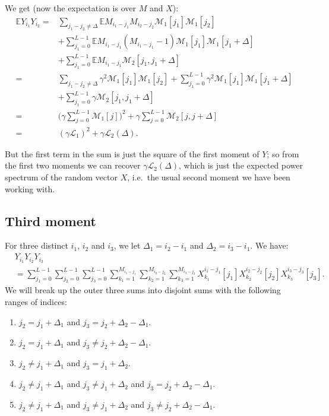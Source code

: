 \documentclass[12pt]{article}
\newcommand{\E}{\mathbb{E}}
\newcommand{\1}{\mathbf{1}}
\newcommand{\M}{\mathcal{M}}
\renewcommand{\L}{\mathcal{L}}
\theoremstyle{plain}
\theoremstyle{definition}
\theoremstyle{remark}
\theoremstyle{plain}
\theoremstyle{remark}
\theoremstyle{plain}
\theoremstyle{plain}
\theoremstyle{plain}
\numberwithin{equation}{section}
\begin{document}
We get (now the expectation is over $M$ and $X$):
%
\begin{align}
%
\E Y_{i_1} Y_{i_2} 
=& \sum_{j_1 - j_2 \ne \Delta} \E M_{i_1-j_1} M_{i_2 - j_2} \M_1[j_1] \M_1[j_2]
\nonumber \\
& + \sum_{j_1 = 0}^{L-1} \E M_{i_1-j_1}(M_{i_1-j_1} - 1) \M_1[j_1] \M_1[j_1 + \Delta]
\nonumber \\
& + \sum_{j_1 = 0}^{L-1} \E M_{i_1-j_1} \M_2[j_1,j_1 + \Delta]
\nonumber \\
=& \sum_{j_1 - j_2 \ne \Delta} \gamma^2 \M_1[j_1] \M_1[j_2]
+ \sum_{j_1 = 0}^{L-1} \gamma^2 \M_1[j_1] \M_1[j_1 + \Delta]
\nonumber \\
& + \sum_{j_1 = 0}^{L-1} \gamma \M_2[j_1,j_1 + \Delta]
\nonumber \\
=&  \bigg(\gamma \sum_{j = 0}^{L-1} \M_1[j] \bigg)^2
+ \gamma \sum_{j = 0}^{L-1} \M_2[j,j + \Delta]
\nonumber \\
=&  (\gamma \L_1)^2 + \gamma \L_2(\Delta).
%
\end{align}

But the first term in the sum is just the square of the first moment of $Y$; so from the first two moments we can recover $\gamma \L_2(\Delta)$, which is just the expected power spectrum of the random vector $X$, i.e.\ the usual second moment we have been working with.


%


\subsection{Third moment}

For three distinct $i_1$, $i_2$ and $i_3$, we let $\Delta_1 = i_2 - i_1$ and $\Delta_2 = i_3 - i_1$. We have:
%
\begin{align}
%
&Y_{i_1} Y_{i_2} Y_{i_3}
\nonumber \\
&= \sum_{j_1=0}^{L-1} \sum_{j_2=0}^{L-1} \sum_{j_3=0}^{L-1} 
\sum_{k_1=1}^{M_{i_1-j_1}}\sum_{k_2=1}^{M_{i_2-j_2}} \sum_{k_3=1}^{M_{i_3-j_3}}
X_{k_1}^{i_1-j_1}[j_1] X_{k_2}^{i_2 - j_2}[j_2] X_{k_3}^{i_3 - j_3}[j_3].
\end{align}
%
We will break up the outer three sums into disjoint sums with the following ranges of indices:
%
\begin{enumerate}
	
	\item \label{case1}
	$j_2 = j_1 + \Delta_1$ and $j_3 = j_2 + \Delta_2 - \Delta_1$.
	
	\item \label{case2}
	$j_2 = j_1 + \Delta_1$ and $j_3 \ne j_2 + \Delta_2 - \Delta_1$.
	
	\item \label{case3}
	$j_2 \ne j_1 + \Delta_1$ and $j_3 = j_1 + \Delta_2$.
	
	\item \label{case4}
	$j_2 \ne j_1 + \Delta_1$ and $j_3 \ne j_1 + \Delta_2$ and $j_3 = j_2 + \Delta_2 - \Delta_1$.
	
	\item \label{case5}
	$j_2 \ne j_1 + \Delta_1$ and $j_3 \ne j_1 + \Delta_2$ and $j_3 \ne j_2 + \Delta_2 - \Delta_1$.
	
\end{enumerate}
\end{document}
